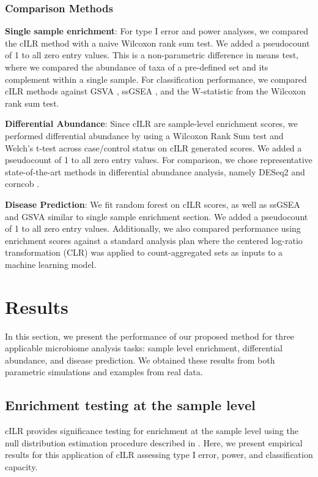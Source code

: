\documentclass{article}
\begin{document}
\subsubsection*{Comparison Methods}

\noindent \textbf{Single sample enrichment}: For type I error and power analyses, we compared the cILR method with a naive Wilcoxon rank sum test. We added a pseudocount of 1 to all zero entry values. This is a non-parametric difference in means test, where we compared the abundance of taxa of a pre-defined set and its complement within a single sample. For classification performance, we compared cILR methods against GSVA \cite{hanzelmann2013}, ssGSEA \cite{barbie2009}, and the W-statistic from the Wilcoxon rank sum test.

\noindent \textbf{Differential Abundance}: Since cILR are sample-level enrichment scores, we performed differential abundance by using a Wilcoxon Rank Sum test and Welch's t-test across case/control status on cILR generated scores. We added a pseudocount of 1 to all zero entry values. For comparison, we chose representative state-of-the-art methods in differential abundance analysis, namely DESeq2 \cite{love2014,mcmurdie2014} and corncob \cite{martin2020}. 

\noindent \textbf{Disease Prediction}: We fit random forest on cILR scores, as well as ssGSEA \cite{hanzelmann2013} and GSVA \cite{barbie2009} similar to single sample enrichment section. We added a pseudocount of 1 to all zero entry values. Additionally, we also compared performance using enrichment scores against a standard analysis plan where the centered log-ratio transformation (CLR) was applied to count-aggregated sets as inputs to a machine learning model.  

\section*{Results}
In this section, we present the performance of our proposed method for three applicable microbiome analysis tasks: sample level enrichment, differential abundance, and disease prediction. We obtained these results from both parametric simulations and examples from real data.  

\subsection*{Enrichment testing at the sample level}
cILR provides significance testing for enrichment at the sample level using the null distribution estimation procedure described in . Here, we present empirical results for this application of cILR assessing type I error, power, and classification capacity. 
\end{document}
